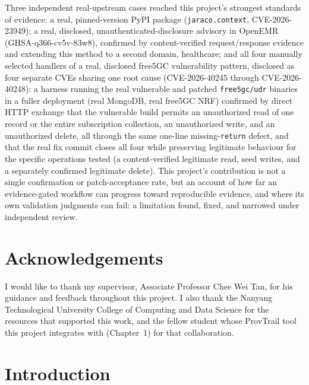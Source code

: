 \documentclass[12pt,a4paper]{report}
\begin{document}
Three independent real-upstream cases reached this project's strongest standards of evidence: a real, pinned-version PyPI package (\texttt{jaraco.context}, CVE-2026-23949); a real, disclosed, unauthenticated-disclosure advisory in OpenEMR (GHSA-q366-cv5v-83w8), confirmed by content-verified request/response evidence and extending this method to a second domain, healthcare; and all four manually selected handlers of a real, disclosed free5GC vulnerability pattern, disclosed as four separate CVEs sharing one root cause (CVE-2026-40245 through CVE-2026-40248): a harness running the real vulnerable and patched \texttt{free5gc/udr} binaries in a fuller deployment (real MongoDB, real free5GC NRF) confirmed by direct HTTP exchange that the vulnerable build permits an unauthorized read of one record or the entire subscription collection, an unauthorized write, and an unauthorized delete, all through the same one-line missing-\texttt{return} defect, and that the real fix commit closes all four while preserving legitimate behaviour for the specific operations tested (a content-verified legitimate read, seed writes, and a separately confirmed legitimate delete). This project's contribution is not a single confirmation or patch-acceptance rate, but an account of how far an evidence-gated workflow can progress toward reproducible evidence, and where its own validation judgments can fail: a limitation found, fixed, and narrowed under independent review.

\chapter*{Acknowledgements}

I would like to thank my supervisor, Associate Professor Chee Wei Tan, for his guidance and feedback throughout this project. I also thank the Nanyang Technological University College of Computing and Data Science for the resources that supported this work, and the fellow student whose ProvTrail tool this project integrates with (Chapter~1) for that collaboration.

\clearpage

\tableofcontents
\listoffigures
\listoftables

\clearpage
{}

\chapter{Introduction}
\end{document}
